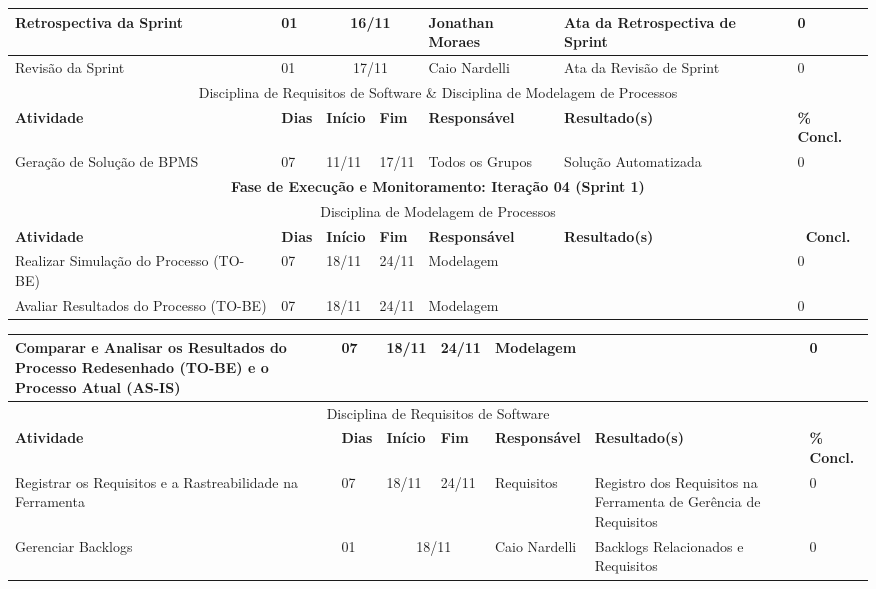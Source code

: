 \begin{landscape}
\begin{center}
\begin{tabular}{|m{6cm}|m{1cm}|m{1cm}|m{1cm}|m{4cm}|m{6cm}|m{2cm}|}
			Retrospectiva da Sprint & 01 & \multicolumn{2}{c|}{16/11} & Jonathan Moraes & Ata da Retrospectiva de Sprint & 0 \\ \hline
			Revisão da Sprint & 01 & \multicolumn{2}{c|}{17/11} & Caio Nardelli & Ata da Revisão de Sprint & 0 \\ \hline
			\multicolumn{7}{|c|}{Disciplina de Requisitos de Software \& Disciplina de Modelagem de Processos} \\ \hline
			\textbf{Atividade} & \textbf{Dias} & \textbf{Início} & \textbf{Fim} & \textbf{Responsável} & \textbf{Resultado(s)} & \textbf{\% Concl.} \\ \hline
			Geração de Solução de BPMS & 07 & 11/11 & 17/11 & Todos os Grupos & Solução Automatizada & 0 \\ \hline
			\multicolumn{7}{|c|}{\textbf{Fase de Execução e Monitoramento: Iteração 04 (Sprint 1)}} \\
			\hline
			\multicolumn{7}{|c|}{Disciplina de Modelagem de Processos} \\
			\hline
			\textbf{Atividade} & \textbf{Dias} & \textbf{Início} & \textbf{Fim} & \textbf{Responsável} & \textbf{Resultado(s)} & \textbf{\ Concl.} \\ \hline
			Realizar Simulação do Processo (TO-BE) & 07 & 18/11 & 24/11 & Modelagem & & 0 \\ \hline
			Avaliar Resultados do Processo (TO-BE) & 07 & 18/11 & 24/11 & Modelagem & & 0 \\ \hline
			\end{tabular}
		\end{center}
		\begin{center}
			\begin{tabular}{|m{6cm}|m{1cm}|m{1cm}|m{1cm}|m{4cm}|m{6cm}|m{2cm}|}
			\hline
			Comparar e Analisar os Resultados do Processo Redesenhado (TO-BE) e o Processo Atual (AS-IS) & 07 & 18/11 & 24/11 & Modelagem & & 0 \\ \hline
			\multicolumn{7}{|c|}{Disciplina de Requisitos de Software} \\
			\hline
			\textbf{Atividade} & \textbf{Dias} & \textbf{Início} & \textbf{Fim} & \textbf{Responsável} & \textbf{Resultado(s)} & \textbf{\% Concl.} \\ \hline
			Registrar os Requisitos e a Rastreabilidade na Ferramenta & 07 & 18/11 & 24/11 & Requisitos & Registro dos Requisitos na Ferramenta de Gerência de Requisitos & 0 \\ \hline
			Gerenciar Backlogs & 01 & \multicolumn{2}{c|}{18/11} & Caio Nardelli & Backlogs Relacionados e Requisitos & 0 \\ \hline

\end{tabular}
\end{center}
\end{landscape}
